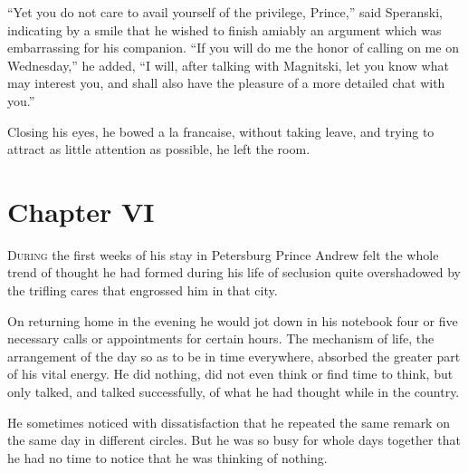 ``Yet you do not care to avail yourself of the privilege,
Prince,'' said Speranski, indicating by a smile that he wished to
finish amiably an argument which was embarrassing for his
companion. ``If you will do me the honor of calling on me on
Wednesday,'' he added, ``I will, after talking with Magnitski,
let you know what may interest you, and shall also have the
pleasure of a more detailed chat with you.''

Closing his eyes, he bowed a la francaise, without taking leave,
and trying to attract as little attention as possible, he left
the room.


\chapter*{Chapter VI}
\ifaudio     
{} 
\fi

\lettrine[lines=2, loversize=0.3, lraise=0]{\initfamily D}{uring}
the first weeks of his stay in Petersburg Prince Andrew
felt the whole trend of thought he had formed during his life of
seclusion quite overshadowed by the trifling cares that engrossed
him in that city.

On returning home in the evening he would jot down in his
notebook four or five necessary calls or appointments for certain
hours. The mechanism of life, the arrangement of the day so as to
be in time everywhere, absorbed the greater part of his vital
energy. He did nothing, did not even think or find time to think,
but only talked, and talked successfully, of what he had thought
while in the country.

He sometimes noticed with dissatisfaction that he repeated the
same remark on the same day in different circles. But he was so
busy for whole days together that he had no time to notice that
he was thinking of nothing.

